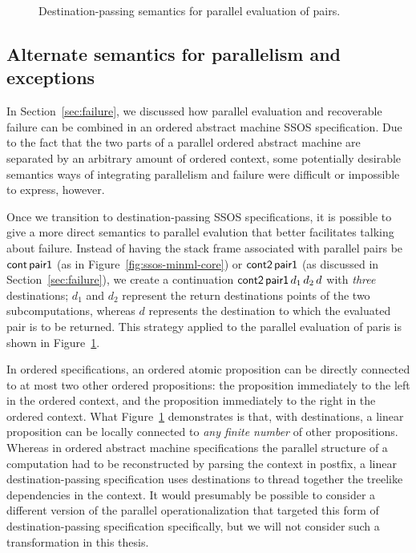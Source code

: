 \begin{figure}
\caption{Destination-passing semantics for parallel evaluation of pairs.}
\label{fig:dest-pair}
\end{figure}

\subsection{Alternate semantics for parallelism and exceptions}
\label{sec:modular-parallelism}

In Section~\ref{sec:failure}, we discussed how parallel evaluation and
recoverable failure can be combined in an ordered abstract machine
SSOS specification. Due to the fact that the two parts of a parallel
ordered abstract machine are separated by an arbitrary amount of
ordered context, some potentially desirable semantics ways of
integrating parallelism and failure were difficult or impossible to
express, however. 

Once we transition to destination-passing SSOS specifications, it is
possible to give a more direct semantics to parallel evalution that
better facilitates talking about failure. Instead of having the stack
frame associated with parallel pairs be ${\sf cont}\,{\sf pair1}$ (as
in Figure~\ref{fig:ssos-minml-core}) or ${\sf cont2}\,{\sf pair1}$ (as
discussed in Section~\ref{sec:failure}), we create a continuation
${\sf cont2}\,{\sf pair1}\,d_1\,d_2\,d$ with {\it three} destinations;
$d_1$ and $d_2$ represent the return destinations points of the two
subcomputations, whereas $d$ represents the destination to which the
evaluated pair is to be returned. This strategy applied to the
parallel evaluation of paris is shown in Figure~\ref{fig:dest-pair}.

In ordered specifications, an ordered atomic proposition can be
directly connected to at most two other ordered propositions: the
proposition immediately to the left in the ordered context, and the
proposition immediately to the right in the ordered context. What
Figure~\ref{fig:dest-pair} demonstrates is that, with destinations, a
linear proposition can be locally connected to {\it any finite number}
of other propositions. Whereas in ordered abstract machine
specifications the parallel structure of a computation had to be
reconstructed by parsing the context in postfix, a linear
destination-passing specification uses destinations to thread together
the treelike dependencies in the context. It would presumably be
possible to consider a different version of the parallel
operationalization that targeted this form of destination-passing
specification specifically, but we will not consider such a
transformation in this thesis. 


